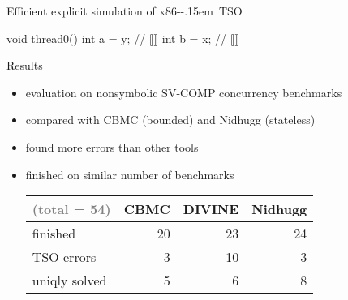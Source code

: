 \documentclass[aspectratio=169, fi]{paradise-slide}
\newcommand{\xtso}{\mbox{x86-\kern-.15em TSO}\xspace}
\begin{document}
\begin{frame}[fragile]{Efficient explicit simulation of \xtso}
\begin{minipage}[t]{0.35\textwidth}
  \newcommand{\ly}{\only<2->{\only<2>{\textcolor{frombuf}}{\textrightarrow 2}}}
  \newcommand{\lx}{\only<4->{\only<4-5>{\textcolor{frombuf}}{\textrightarrow 3}}}
  \begin{cppcode}
  void thread0() {
    int a = y; // ⟦\ly⟧
    int b = x; // ⟦\lx⟧
  }
  \end{cppcode}
  \end{minipage}
  \begin{minipage}[t]{0.60\textwidth}
      \begin{itemize}
      \end{itemize}
  \end{minipage}
\end{frame}

\begin{frame}{Results}

  \begin{itemize}
    \item evaluation on nonsymbolic SV-COMP concurrency benchmarks
    \item compared with CBMC (bounded) and Nidhugg (stateless)
    \item found more errors than other tools
    \item finished on similar number of benchmarks

    \bigskip\bigskip
    \setlength\tabcolsep{0.5em} %
    \begin{tabular}{lrrr} \toprule
        \textcolor{gray}{(total = 54)} & CBMC & \textbf{DIVINE} & Nidhugg \\ \midrule
        finished                & 20   & 23     & 24 \\
        TSO errors              &  3   & 10     &  3 \\
        uniqly solved           &  5   &  6     &  8 \\
        \bottomrule
    \end{tabular}
  \end{itemize}
\end{frame}
\end{document}
